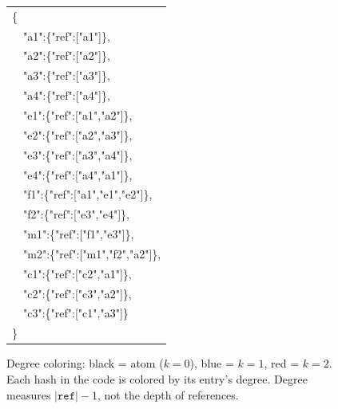 \begin{figure}[ht]
\centering
\begin{minipage}[t]{0.48\textwidth}
\vspace{0pt}
\centering
\scalebox{1.5}{}
\end{minipage}%
\hspace{4pt}%
\begin{minipage}[t]{0.48\textwidth}
\vspace{0pt}
{\scriptsize\ttfamily
\begin{tabular}{@{}l@{}}
\{\\
\ \ \textcolor{black}{"a1"}:\{"ref":["\textcolor{black}{a1}"]\},\\
\ \ \textcolor{black}{"a2"}:\{"ref":["\textcolor{black}{a2}"]\},\\
\ \ \textcolor{black}{"a3"}:\{"ref":["\textcolor{black}{a3}"]\},\\
\ \ \textcolor{black}{"a4"}:\{"ref":["\textcolor{black}{a4}"]\},\\
\ \ \textcolor{blue!70!black}{"e1"}:\{"ref":["\textcolor{black}{a1}","\textcolor{black}{a2}"]\},\\
\ \ \textcolor{blue!70!black}{"e2"}:\{"ref":["\textcolor{black}{a2}","\textcolor{black}{a3}"]\},\\
\ \ \textcolor{blue!70!black}{"e3"}:\{"ref":["\textcolor{black}{a3}","\textcolor{black}{a4}"]\},\\
\ \ \textcolor{blue!70!black}{"e4"}:\{"ref":["\textcolor{black}{a4}","\textcolor{black}{a1}"]\},\\
\ \ \textcolor{red!70!black}{"f1"}:\{"ref":["\textcolor{black}{a1}","\textcolor{blue!70!black}{e1}","\textcolor{blue!70!black}{e2}"]\},\\
\ \ \textcolor{blue!70!black}{"f2"}:\{"ref":["\textcolor{blue!70!black}{e3}","\textcolor{blue!70!black}{e4}"]\},\\
\ \ \textcolor{blue!70!black}{"m1"}:\{"ref":["\textcolor{red!70!black}{f1}","\textcolor{blue!70!black}{e3}"]\},\\
\ \ \textcolor{red!70!black}{"m2"}:\{"ref":["\textcolor{blue!70!black}{m1}","\textcolor{blue!70!black}{f2}","\textcolor{black}{a2}"]\},\\
\ \ \textcolor{blue!70!black}{"c1"}:\{"ref":["\textcolor{blue!70!black}{c2}","\textcolor{black}{a1}"]\},\\
\ \ \textcolor{blue!70!black}{"c2"}:\{"ref":["\textcolor{blue!70!black}{c3}","\textcolor{black}{a2}"]\},\\
\ \ \textcolor{blue!70!black}{"c3"}:\{"ref":["\textcolor{blue!70!black}{c1}","\textcolor{black}{a3}"]\}\\
\}
\end{tabular}
}
\end{minipage}
\caption{Degree coloring: black = atom ($k=0$), \textcolor{blue!70!black}{blue} = $k=1$, \textcolor{red!70!black}{red} = $k=2$. Each hash in the code is colored by its entry's degree. Degree measures $|\texttt{ref}| - 1$, not the depth of references.}
\label{fig:degree-coloring}
\end{figure}

